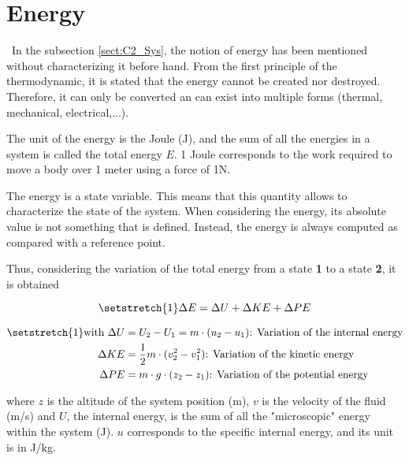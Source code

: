 \section{Energy}\label{sect:C2_Ener}
\quad\, In the subsection \ref{sect:C2_Sys}, the notion of energy has been mentioned without characterizing it before hand. From the first principle of the thermodynamic, it is stated that the energy cannot be created nor destroyed. Therefore, it can only be converted an can exist into multiple forms (thermal, mechanical, electrical,...)\cite{thermoApp_2}. 

The unit of the energy is the Joule (J), and the sum of all the energies in a system is called the total energy $E$. 1 Joule corresponds to the work required to move a body over 1 meter using a force of 1N.


The energy is a state variable. This means that this quantity allows to characterize the state of the system. When considering the energy, its absolute value is not something that is defined. Instead, the energy is always computed as compared with a reference point.

Thus, considering the variation of the total energy from a state \textbf{1} to a state \textbf{2}, it is obtained

\begin{equation}
\setstretch{1}
    \Delta E = \Delta U + \Delta KE + \Delta PE \label{eq:C2_E}
\end{equation}

\begin{align*}
\setstretch{1}
    \text{with } \Delta U  &= U_2 - U_1 =  m\cdot(u_2 - u_1) \text{: Variation of the internal energy}\\
                 \Delta KE &= \frac{1}{2}m\cdot(v^2_2 - v^2_1)\text{: Variation of the kinetic energy}\\
                 \Delta PE &= m\cdot g\cdot(z_2 - z_1)\text{: Variation of the potential energy}
\end{align*} 

where $z$ is the altitude of the system position (m), $v$ is the velocity of the fluid (m/s) and $U$, the internal energy, is the sum of all the "microscopic" energy within the system (J). $u$ corresponds to the specific internal energy, and its unit is in J/kg.

